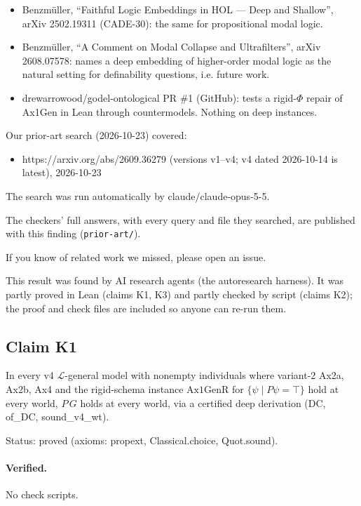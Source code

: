 \documentclass{article}
\begin{document}
\begin{itemize}
\item Benzmüller, ``Faithful Logic Embeddings in HOL --- Deep and Shallow'', arXiv 2502.19311 (CADE-30): the same for propositional modal logic.
\item Benzmüller, ``A Comment on Modal Collapse and Ultrafilters'', arXiv 2608.07578: names a deep embedding of higher-order modal logic as the natural setting for definability questions, i.e. future work.
\item drewarrowood/godel-ontological PR \#1 (GitHub): tests a rigid-$\Phi$ repair of Ax1Gen in Lean through countermodels. Nothing on deep instances.
\end{itemize}

Our prior-art search (2026-10-23) covered:

\begin{itemize}
\item https://arxiv.org/abs/2609.36279 (versions v1--v4; v4 dated 2026-10-14 is latest), 2026-10-23
\end{itemize}

The search was run automatically by claude/claude-opus-5-5.

The checkers' full answers, with every query and file they searched, are published with this finding (\texttt{prior-art/}).

If you know of related work we missed, please open an issue.

This result was found by AI research agents (the autoresearch harness). It was partly proved in Lean (claims K1, K3) and partly checked by script (claims K2); the proof and check files are included so anyone can re-run them.

\subsection*{Claim K1}

In every v4 $\mathcal L$-general model with nonempty individuals where variant-2 Ax2a, Ax2b, Ax4 and the rigid-schema instance $\mathrm{Ax1GenR}$ for $\{\psi\mid P\psi=\top\}$ hold at every world, $P\,G$ holds at every world, via a certified deep derivation (DC, of\_DC, sound\_v4\_wt).

Status: proved (axioms: propext, Classical.choice, Quot.sound).

\paragraph{Verified.}
No check scripts.
\end{document}
